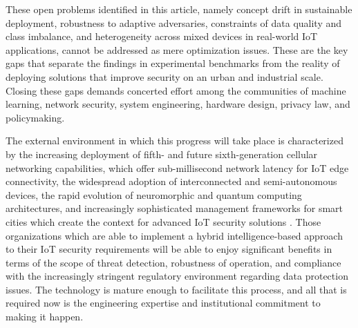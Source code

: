 \documentclass[12pt]{article}
\begin{document}
These open problems identified in this article, namely concept drift in sustainable deployment, robustness to adaptive adversaries, constraints of data quality and class imbalance, and heterogeneity across mixed devices in real-world IoT applications, cannot be addressed as mere optimization issues. These are the key gaps that separate the findings in experimental benchmarks from the reality of deploying solutions that improve security on an urban and industrial scale. Closing these gaps demands concerted effort among the communities of machine learning, network security, system engineering, hardware design, privacy law, and policymaking.

The external environment in which this progress will take place is characterized by the increasing deployment of fifth- and future sixth-generation cellular networking capabilities, which offer sub-millisecond network latency for IoT edge connectivity, the widespread adoption of interconnected and semi-autonomous devices, the rapid evolution of neuromorphic and quantum computing architectures, and increasingly sophisticated management frameworks for smart cities which create the context for advanced IoT security solutions \cite{khan2018iot}. Those organizations which are able to implement a hybrid intelligence-based approach to their IoT security requirements will be able to enjoy significant benefits in terms of the scope of threat detection, robustness of operation, and compliance with the increasingly stringent regulatory environment regarding data protection issues. The technology is mature enough to facilitate this process, and all that is required now is the engineering expertise and institutional commitment to making it happen.




\end{document}
